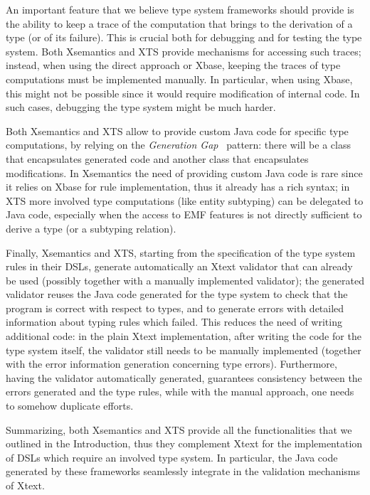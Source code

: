 An important feature that we believe type system frameworks should provide is
the ability to keep a trace of the computation that brings to the derivation of
a type (or of its failure).  This is crucial both for debugging and for testing
the type system.  Both Xsemantics and XTS provide mechanisms for accessing such
traces; instead, when using the direct approach or Xbase, keeping the traces of
type computations must be implemented manually.  In particular, when using
Xbase, this might not be possible since it would require modification of
internal code.  In such cases, debugging the type system might be much harder.

Both Xsemantics and XTS allow to provide custom Java code for specific type
computations, by relying on the \emph{Generation Gap}~\cite{Vlissides:1996:GGS}
pattern: there will be a class that encapsulates generated code and another
class that encapsulates modifications.  In Xsemantics the need of providing
custom Java code is rare since it relies on Xbase for rule implementation, thus
it already has a rich syntax; in XTS more involved type computations (like
entity subtyping) can be delegated to Java code, especially when the access to
EMF features is not directly sufficient to derive a type (or a subtyping
relation).

Finally, Xsemantics and XTS, starting from the specification of the type system
rules in their DSLs, generate automatically an Xtext validator that can already
be used (possibly together with a manually implemented validator); the generated
validator reuses the Java code generated for the type system to check that the
program is correct with respect to types, and to generate errors with
detailed information about typing rules which failed.
This reduces the need of writing additional code: in the plain Xtext
implementation, after writing the code for the type system itself, the validator
still needs to be manually implemented (together with the error information
generation concerning type errors).  Furthermore, having the validator
automatically generated, guarantees consistency between the errors generated and
the type rules, while with the manual approach, one needs to somehow duplicate
efforts.

Summarizing, both Xsemantics and XTS provide all the functionalities that we
outlined in the Introduction, thus they complement Xtext for the implementation
of DSLs which require an involved type system.  In particular, the Java code
generated by these frameworks seamlessly integrate in the validation mechanisms
of Xtext. 

